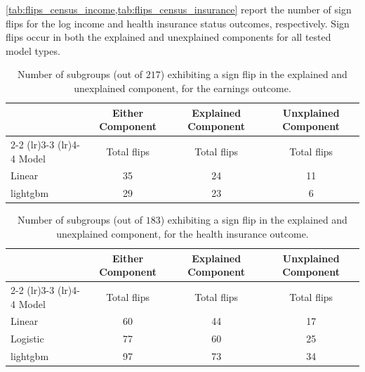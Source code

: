 \cref{tab:flips_census_income,tab:flips_census_insurance} report the number of sign flips for the log income and health insurance status outcomes, respectively.
Sign flips occur in both the explained and unexplained components for all tested model types.

\begin{table}[!ht]
    \caption{Number of subgroups (out of $217$) exhibiting a sign flip in the explained and unexplained component, for the earnings outcome.}
    \label{tab:flips_census_income}
    \centering
    \small
    \begin{tabular}{lccc}
    \toprule
          & \multicolumn{1}{c}{Either Component} & \multicolumn{1}{c}{Explained Component} & \multicolumn{1}{c}{Unxplained Component} \\
          \cmidrule(lr){2-2} \cmidrule(lr){3-3} \cmidrule(lr){4-4}
    Model & Total flips & Total flips & Total flips \\
    \midrule
    Linear      & 35 & 24 & 11 \\    
    lightgbm    & 29 & 23 & 6  \\
    \bottomrule
    \end{tabular}
\end{table}

% 
\begin{table}[!ht]
    \caption{Number of subgroups (out of $183$) exhibiting a sign flip in the explained and unexplained component, for the health insurance outcome.}
    \label{tab:flips_census_insurance}
    \centering
    \small
    \begin{tabular}{lccc}
    \toprule
          & \multicolumn{1}{c}{Either Component} & \multicolumn{1}{c}{Explained Component} & \multicolumn{1}{c}{Unxplained Component} \\
          \cmidrule(lr){2-2} \cmidrule(lr){3-3} \cmidrule(lr){4-4}
    Model & Total flips & Total flips & Total flips \\
    \midrule
    Linear      & 60  & 44 & 17 \\
    Logistic    & 77  & 60 & 25 \\
    lightgbm    & 97  & 73 & 34 \\
    \bottomrule
    \end{tabular}
\end{table}
